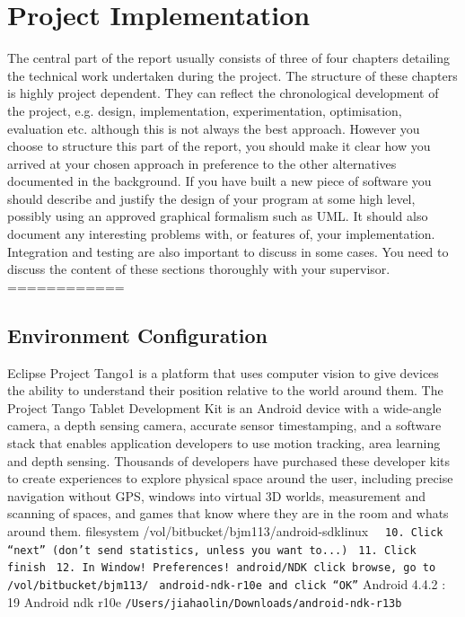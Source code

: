 \documentclass[12pt,twoside]{article}
\begin{document}
\newpage

\section{Project Implementation}

The central part of the report usually consists of three of four chapters detailing the technical work undertaken during the project. The structure of these chapters is highly project dependent. They can reflect the chronological development of the project, e.g. design, implementation, experimentation, optimisation, evaluation etc. although this is not always the best approach. However you choose to structure this part of the report, you should make it clear how you arrived at your chosen approach in preference to the other alternatives documented in the background. If you have built a new piece of software you should describe and justify the design of your program at some high level, possibly using an approved graphical formalism such as UML. It should also document any interesting problems with, or features of, your implementation. Integration and testing are also important to discuss in some cases. You need to discuss the content of these sections thoroughly with your supervisor.\\

============\\
\subsection{Environment Configuration}
Eclipse
Project Tango1 is a platform that uses computer vision to give devices the ability to understand their
position relative to the world around them. The Project Tango Tablet Development Kit is an Android
device with a wide-angle camera, a depth sensing camera, accurate sensor timestamping, and a software
stack that enables application developers to use motion tracking, area learning and depth sensing.
Thousands of developers have purchased these developer kits to create experiences to explore physical
space around the user, including precise navigation without GPS, windows into virtual 3D worlds,
measurement and scanning of spaces, and games that know where they are in the room and whats
around them.
filesystem /vol/bitbucket/bjm113/android-sdklinux
\verb|  10. Click “next” (don’t send statistics, unless you want to...)|
\verb| 11. Click finish|
\verb| 12. In Window! Preferences! android/NDK click browse, go to /vol/bitbucket/bjm113/|
\verb| android-ndk-r10e and click “OK”|
Android 4.4.2  : 19
Android ndk r10e
\verb|/Users/jiahaolin/Downloads/android-ndk-r13b |
\end{document}
